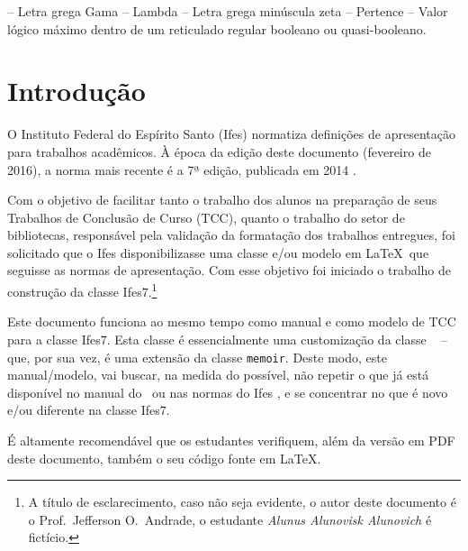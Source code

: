 \documentclass[times,english,brazil,oneside]{ifes8}
\newcommand{\ifestex}{\textsf{Ifes$7$}}
\begin{document}
\begin{simbolos}
  \simb{$\Gamma$} -- Letra grega Gama
  \simb{$\Lambda$} -- Lambda
  \simb{$\zeta$} -- Letra grega minúscula zeta
  \simb{$\in$} -- Pertence
  \simb{$\top$} -- Valor lógico máximo dentro de um reticulado regular booleano ou quasi-booleano.
\end{simbolos}
\cleardoublepage


\tableofcontents*
\cleardoublepage


\textual


\setlength{\afterchapskip}{0\baselineskip}


\chapter{Introdução}
\label{cha:introducao}

O Instituto Federal do Espírito Santo (Ifes) normatiza definições de
apresentação para trabalhos acadêmicos. À época da edição deste
documento (fevereiro de 2016), a norma mais recente é a 7ª edição,
publicada em 2014 \cite{Ifes2014}.

Com o objetivo de facilitar tanto o trabalho dos alunos na preparação
de seus Trabalhos de Conclusão de Curso (TCC), quanto o trabalho do
setor de bibliotecas, responsável pela validação da formatação dos
trabalhos entregues, foi solicitado que o Ifes disponibilizasse uma
classe e/ou modelo em \LaTeX\ que seguisse as normas de
apresentação. Com esse objetivo foi iniciado o trabalho de construção
da classe \ifestex.\footnote{A título de esclarecimento, caso não seja
  evidente, o autor deste documento é o Prof.\ Jefferson O.\ Andrade,
  o estudante \emph{Alunus Alunovisk Alunovich} é fictício.}

Este documento funciona ao mesmo tempo como manual e como modelo de
TCC para a classe \ifestex. Esta classe é essencialmente uma
customização da classe \abnTeX\ \cite{abntex2classe} -- que, por sua
vez, é uma extensão da classe \texttt{memoir}. Deste modo, este
manual/modelo, vai buscar, na medida do possível, não repetir o que já
está disponível no manual do \abnTeX\ ou nas normas do Ifes
\cite{Ifes2014}, e se concentrar no que é novo e/ou diferente na
classe \ifestex.

É altamente recomendável que os estudantes verifiquem, além da versão
em PDF deste documento, também o seu código fonte em \LaTeX.
\end{document}
